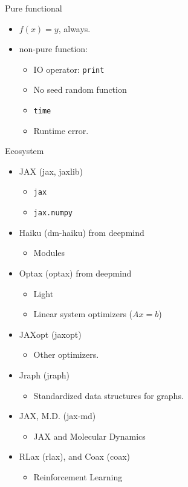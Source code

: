 \documentclass[aspectratio=1610,xcolor={dvipsnames},hyperref={colorlinks,unicode,linkcolor=violet,anchorcolor=BlueViolet,citecolor=YellowOrange,filecolor=black,urlcolor=Aquamarine}]{beamer}
\begin{document}
\begin{frame}[label={sec:org110f7b0},fragile]{Pure functional}
 \begin{itemize}
\item \(f(x) = y\), always.
\item non-pure function:
\begin{itemize}
\item IO operator: \texttt{print}
\item No seed random function
\item \texttt{time}
\item Runtime error.
\end{itemize}
\end{itemize}
\end{frame}

\begin{frame}[label={sec:org0177242},fragile]{Ecosystem}
 \begin{itemize}
\item JAX (jax, jaxlib)
\begin{itemize}
\item \texttt{jax}
\item \texttt{jax.numpy}
\end{itemize}
\item Haiku (dm-haiku) from deepmind
\begin{itemize}
\item Modules
\end{itemize}
\item Optax (optax) from deepmind
\begin{itemize}
\item Light
\item Linear system optimizers (\(Ax = b\))
\end{itemize}
\item JAXopt (jaxopt)
\begin{itemize}
\item Other optimizers.
\end{itemize}
\item Jraph (jraph)
\begin{itemize}
\item Standardized data structures for graphs.
\end{itemize}
\item JAX, M.D. (jax-md)
\begin{itemize}
\item JAX and Molecular Dynamics
\end{itemize}
\item RLax (rlax), and Coax (coax)
\begin{itemize}
\item Reinforcement Learning
\end{itemize}
\end{itemize}
\end{frame}
\end{document}
